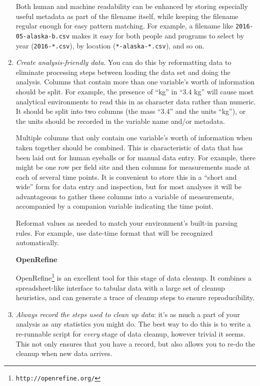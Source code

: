 \documentclass[10pt]{article}
\newcommand{\recommend}[1]{\textit{#1}}
\newcommand{\withurl}[2]{{#1}\footnote{\texttt{#2}}}
\begin{document}
\begin{enumerate}
  Both human and machine readability can be enhanced by storing
  especially useful metadata as part of the filename itself, while
  keeping the filename regular enough for easy pattern matching. For
  example, a filename like \texttt{2016-05-alaska-b.csv} makes it easy
  for both people and programs to select by year
  (\texttt{2016-*.csv}), by location (\texttt{*-alaska-*.csv}), and so
  on.

\item
  \recommend{Create analysis-friendly data}.  You can do this by
  reformatting data to eliminate processing steps between loading the
  data set and doing the analysis.
  Columns that contain more than one variable's worth of information
  should be split. For example, the presence of ``kg'' in ``3.4 kg''
  will cause most analytical environments to read this in as character
  data rather than numeric. It should be split into two columns (the
  mass ``3.4'' and the units ``kg''), or the units should be recorded
  in the variable name and/or metadata.

  Multiple columns that only contain one variable's worth of information
  when taken together should be combined. This is characteristic of data
  that has been laid out for human eyeballs or for manual data entry.
  For example, there might be one row per field site and then columns
  for measurements made at each of several time points. It is convenient
  to store this in a ``short and wide'' form for data entry and
  inspection, but for most analyses it will be advantageous to gather
  these columns into a variable of measurements, accompanied by a
  companion variable indicating the time point.

  Reformat values as needed to match your environment's built-in parsing
  rules. For example, use date-time format that will be recognized
  automatically.

  \begin{framed}
    \noindent \textbf{OpenRefine}

    \withurl{OpenRefine}{http://openrefine.org/} is an excellent tool for
    this stage of data cleanup. It combines a spreadsheet-like interface
    to tabular data with a large set of cleanup heuristics, and can
    generate a trace of cleanup steps to ensure reproducibility.
  \end{framed}

\item
  \recommend{Always record the steps used to clean up data}:
  it's as much a part of your analysis as any statistics you might do.
  The best way to do this is to write a re-runnable script for \emph{every}
  stage of data cleanup, however trivial it seems.
  This not only ensures that you have a record,
  but also allows you to re-do the cleanup when new data arrives.


\end{enumerate}
\end{document}
